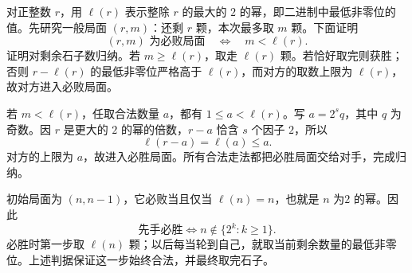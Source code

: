 对正整数 $r$，用 $\ell(r)$ 表示整除 $r$ 的最大的 $2$ 的幂，即二进制中最低非零位的值。先研究一般局面 $(r,m)$：还剩 $r$ 颗，本次最多取 $m$ 颗。下面证明
\[
 (r,m)\text{ 为必败局面}\quad\Longleftrightarrow\quad m<\ell(r).
\]
证明对剩余石子数归纳。若 $m\ge\ell(r)$，取走 $\ell(r)$ 颗。若恰好取完则获胜；否则 $r-\ell(r)$ 的最低非零位严格高于 $\ell(r)$，而对方的取数上限为 $\ell(r)$，故对方进入必败局面。

若 $m<\ell(r)$，任取合法数量 $a$，都有 $1\le a<\ell(r)$。写 $a=2^s q$，其中 $q$ 为奇数。因 $r$ 是更大的 $2$ 的幂的倍数，$r-a$ 恰含 $s$ 个因子 $2$，所以
\[
 \ell(r-a)=\ell(a)\le a.
\]
对方的上限为 $a$，故进入必胜局面。所有合法走法都把必胜局面交给对手，完成归纳。

初始局面为 $(n,n-1)$，它必败当且仅当 $\ell(n)=n$，也就是 $n$ 为$2$ 的幂。因此
\[
 \boxed{\text{先手必胜}\iff n\notin\{2^k:k\ge1\}.}
\]
必胜时第一步取 $\ell(n)$ 颗；以后每当轮到自己，就取当前剩余数量的最低非零位。上述判据保证这一步始终合法，并最终取完石子。
